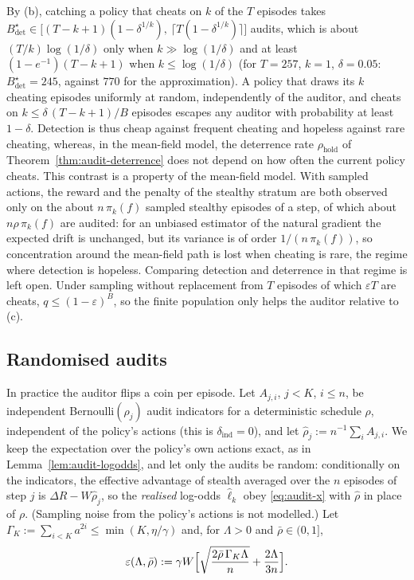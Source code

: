 \begin{remark}\label{rem:audit-detect-deter}
By (b), catching a policy that cheats on $k$ of the $T$ episodes takes
$B^\star_{\det}\in\bigl[(T-k+1)(1-\delta^{1/k}),\ \lceil T(1-\delta^{1/k})\rceil\bigr]$ audits, which is about $(T/k)\log(1/\delta)$ only when $k\gg\log(1/\delta)$ and at least $(1-e^{-1})(T-k+1)$ when $k\le\log(1/\delta)$ (for $T=257$, $k=1$, $\delta=0.05$: $B^\star_{\det}=245$, against $770$ for the approximation). A policy that draws its $k$ cheating episodes uniformly at random, independently of the auditor, and cheats on
$k\le\delta\,(T-k+1)/B$ episodes escapes any auditor with probability at least
$1-\delta$. Detection is thus cheap against frequent cheating and hopeless
against rare cheating, whereas, in the mean-field model, the deterrence rate $\rho_{\mathrm{hold}}$ of
Theorem~\ref{thm:audit-deterrence} does not depend on how often the current
policy cheats. This contrast is a property of the mean-field model. With sampled actions, the reward and the penalty of the stealthy stratum are both observed only on the about $n\,\pi_k(f)$ sampled stealthy episodes of a step, of which about $n\rho\,\pi_k(f)$ are audited: for an unbiased estimator of the natural gradient the expected drift is unchanged, but its variance is of order $1/(n\,\pi_k(f))$, so concentration around the mean-field path is lost when cheating is rare, the regime where detection is hopeless. Comparing detection and deterrence in that regime is left open. Under sampling without replacement from $T$ episodes of which
$\varepsilon T$ are cheats, $q\le(1-\varepsilon)^B$, so the finite population
only helps the auditor relative to (c).
\end{remark}

\subsection{Randomised audits}

In practice the auditor flips a coin per episode. Let $A_{j,i}$,
$j<K$, $i\le n$, be independent Bernoulli$(\rho_j)$ audit indicators for a
deterministic schedule $\rho$, independent of the policy's actions (this is
$\delta_{\mathrm{ind}}=0$), and let $\hat\rho_j:=n^{-1}\sum_iA_{j,i}$. We keep
the expectation over the policy's own actions exact, as in
Lemma~\ref{lem:audit-logodds}, and let only the audits be random: conditionally
on the indicators, the effective advantage of stealth averaged over the $n$
episodes of step $j$ is $\Delta R-W\hat\rho_j$, so the \emph{realised}
log-odds $\hat\ell_k$ obey \eqref{eq:audit-x} with $\hat\rho$ in place of $\rho$.
(Sampling noise from the policy's actions is not modelled.) Let
$\Gamma_K:=\sum_{i<K}a^{2i}\le\min(K,\eta/\gamma)$ and, for $\Lambda>0$ and
$\bar\rho\in(0,1]$,
\[
  \varepsilon(\Lambda,\bar\rho):=\gamma W\Bigl[\sqrt{\frac{2\bar\rho\,\Gamma_K\Lambda}{n}}
  +\frac{2\Lambda}{3n}\Bigr].
\]

